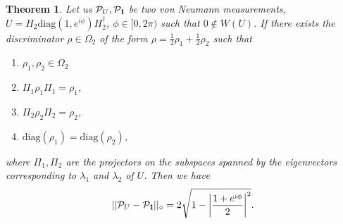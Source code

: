 \documentclass[preprint,12pt, a4paper]{elsarticle}
\newcommand{\1}{{\rm 1\hspace{-0.9mm}l}}
\newcommand{\Id}{{\rm 1\hspace{-0.9mm}l}}
\newcommand{\XX}{\mathcal{X}}
\newcommand{\diag}{\mathrm{diag}}
\newtheorem{theorem}{Theorem}
\begin{document}
\begin{theorem}\label{rozrpomiarow}
Let us $\mathcal{P}_U, \mathcal{P}_\1$ be two von Neumann measurements,  $U = H_2 \diag(1, e^{i \phi}) H_2^\dagger$, $\phi \in [0, 2\pi)$ such that $0 \not\in W(U)$.  If there exists the discriminator $\rho \in \Omega_2$ of the form $\rho = \frac{1}{2}\rho_1 + \frac{1}{2} \rho_2$ such that
	\begin{enumerate}
		\item $\rho_1,\rho_2 \in \Omega_2$
		\item $\Pi_1 \rho_1 \Pi_1 = \rho_1$,
		\item $\Pi_2 \rho_2 \Pi_2 = \rho_2$,
		\item  $\mathrm{diag}(\rho_1) = \mathrm{diag}(\rho_2)$,
	\end{enumerate}
	where $\Pi_1,\Pi_2 $ are the projectors on the subspaces
	spanned by the eigenvectors corresponding to $\lambda_1$ and $\lambda_2$ of $U$. Then  we have 
	\begin{equation}
	||\mathcal{P}_U - \mathcal{P}_\Id||_\diamond = 2\sqrt{1- \left|\frac{1+e^{i \phi}}{2}\right|^2}.
	\end{equation}
\end{theorem}
\end{document}
